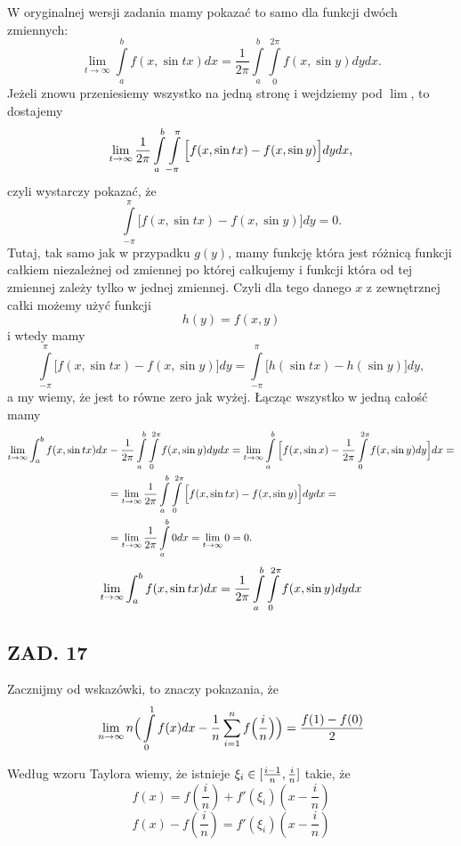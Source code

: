 \documentclass{article}[13pt]
\begin{document}
W oryginalnej wersji zadania mamy pokazać to samo dla funkcji dwóch zmiennych:
$$\lim\limits_{t\to\infty}\int\limits_a^bf(x,\sin tx)dx=\frac1{2\pi}\int\limits_a^b\int\limits_0^{2\pi}f(x,\sin y)dydx.$$
Jeżeli znowu przeniesiemy wszystko na jedną stronę i wejdziemy pod $\lim$, to dostajemy
\begin{align*}
    \lim\limits_{t\to\infty}{1\over 2\pi}\int\limits_a^b\int\limits_{-\pi}^\pi\Big[f(x,\sin tx)-f(x,\sin y)\Big]dydx,
\end{align*}
czyli wystarczy pokazać, że
$$\int\limits_{-\pi}^\pi \Big[f(x,\sin tx)-f(x, \sin y)\Big]dy=0.$$
Tutaj, tak samo jak w przypadku $g(y)$, mamy funkcję która jest różnicą funkcji całkiem niezależnej od zmiennej po której całkujemy i funkcji która od tej zmiennej zależy tylko w jednej zmiennej. Czyli dla tego danego $x$ z zewnętrznej całki możemy użyć funkcji
$$h(y)=f(x, y)$$
i wtedy mamy
$$\int\limits_{-\pi}^\pi\Big[f(x, \sin tx)-f(x, \sin y)\Big]dy=\int\limits_{-\pi}^\pi\Big[h(\sin tx)-h(\sin y)\Big]dy,$$
a my wiemy, że jest to równe zero jak wyżej. Łącząc wszystko w jedną całość mamy
\begin{align*}
    \lim\limits_{t\to\infty}\int_a^bf(x,\sin tx)dx&-{1\over2\pi}\int\limits_a^b\int\limits_0^{2\pi}f(x,\sin y)dydx=\lim\limits_{t\to\infty}\int\limits_a^b\Big[f(x,\sin x)-{1\over2\pi}\int\limits_0^{2\pi}f(x,\sin y)dy\Big]dx=\\
    &=\lim\limits_{t\to\infty}{1\over2\pi}\int\limits_a^b\int\limits_0^{2\pi}\Big[f(x,\sin tx)-f(x,\sin y)\Big]dydx=\\
    &=\lim\limits_{t\to\infty}{1\over 2\pi}\int\limits_a^b0dx=\lim\limits_{t\to\infty}0=0.
\end{align*}
$$\lim\limits_{t\to\infty}\int_a^bf(x,\sin tx)dx={1\over 2\pi}\int\limits_a^b\int\limits_0^{2\pi}f(x,\sin y)dydx$$


\subsection*{ZAD. 17}

Zacznijmy od wskazówki, to znaczy pokazania, że
$$\lim\limits_{n\to\infty}n\Big(\int\limits_0^1f(x)dx-\frac1n\sum\limits_{i=1}^nf\Big(\frac in\Big)\Big)={f(1)-f(0)\over 2}$$

Według wzoru Taylora wiemy, że istnieje $\xi_i\in[{i-1\over n}, \frac in]$ takie, że
$$f(x)=f(\frac in)+f'(\xi_i)(x-\frac in)$$
$$f(x)-f(\frac in)=f'(\xi_i)(x-\frac in)$$
\end{document}
